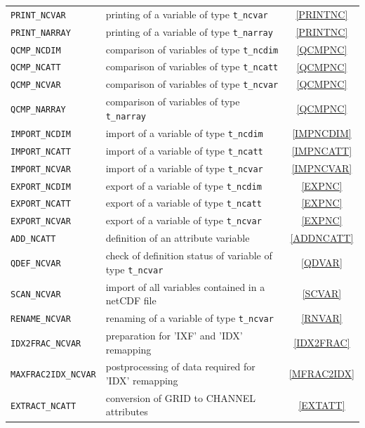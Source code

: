 \documentclass[11pt,twoside]{article}
\begin{document}
\begin{longtable}{|p{5cm}p{8.5cm}c|}
\color{blue} \tt PRINT\_NCVAR & printing of a variable of type {\tt t\_ncvar}& \ref{PRINTNC}\\
\color{blue} \tt PRINT\_NARRAY & printing of a variable of type \verb|t_narray|& \ref{PRINTNC}\\
\color{blue} \tt QCMP\_NCDIM & comparison of variables of type {\tt t\_ncdim} & \ref{QCMPNC}\\
\color{blue} \tt QCMP\_NCATT & comparison of variables of type {\tt t\_ncatt} & \ref{QCMPNC}\\
\color{blue} \tt QCMP\_NCVAR & comparison of variables of type {\tt t\_ncvar}& \ref{QCMPNC}\\
\color{blue} \tt QCMP\_NARRAY & comparison of variables of type \verb|t_narray|
& \ref{QCMPNC}\\

\color{blue} \tt IMPORT\_NCDIM & import of a variable of type {\tt t\_ncdim} & \ref{IMPNCDIM}\\
\color{blue} \tt IMPORT\_NCATT & import of a variable of type {\tt t\_ncatt}  & \ref{IMPNCATT}\\
\color{blue} \tt IMPORT\_NCVAR & import of a variable of type {\tt t\_ncvar}& \ref{IMPNCVAR}\\
\color{blue} \tt EXPORT\_NCDIM & export of a variable of type {\tt t\_ncdim} & \ref{EXPNC}\\
\color{blue} \tt EXPORT\_NCATT & export of a variable of type  {\tt t\_ncatt} & \ref{EXPNC}\\
\color{blue} \tt EXPORT\_NCVAR & export of a variable of type {\tt t\_ncvar}& \ref{EXPNC}\\
\color{blue} \tt ADD\_NCATT & definition of an attribute variable & \ref{ADDNCATT}\\
\color{blue} \tt QDEF\_NCVAR & check of definition status of variable of type {\tt t\_ncvar}& \ref{QDVAR}\\
\color{blue} \tt SCAN\_NCVAR & import of all variables contained in a
netCDF file& \ref{SCVAR}\\
\color{blue} \tt RENAME\_NCVAR & renaming of a variable of type \verb|t_ncvar|& \ref{RNVAR}\\
\color{blue} \tt IDX2FRAC\_NCVAR& preparation for 'IXF' and 'IDX' remapping& \ref{IDX2FRAC}\\
\color{blue} \tt MAXFRAC2IDX\_NCVAR& postprocessing of data required
for 'IDX' remapping & \ref{MFRAC2IDX}\\
\color{blue} \tt EXTRACT\_NCATT & conversion of GRID to CHANNEL attributes & \ref{EXTATT}\\

\end{longtable}
\end{document}
